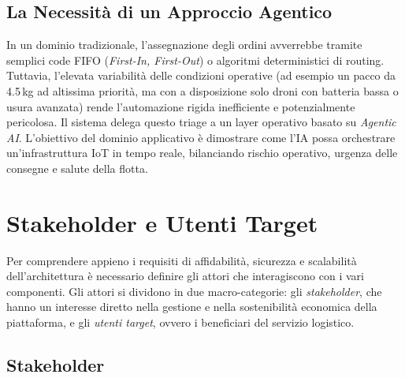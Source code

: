 \subsection*{La Necessità di un Approccio Agentico}

In un dominio tradizionale, l'assegnazione degli ordini avverrebbe tramite semplici code FIFO (\textit{First-In, First-Out}) o algoritmi deterministici di routing. Tuttavia, l'elevata variabilità delle condizioni operative (ad esempio un pacco da 4.5\,kg ad altissima priorità, ma con a disposizione solo droni con batteria bassa o usura avanzata) rende l'automazione rigida inefficiente e potenzialmente pericolosa. Il sistema delega questo triage a un layer operativo basato su \textit{Agentic AI}. L'obiettivo del dominio applicativo è dimostrare come l'IA possa orchestrare un'infrastruttura IoT in tempo reale, bilanciando rischio operativo, urgenza delle consegne e salute della flotta.

\section{Stakeholder e Utenti Target}
\label{sec:stakeholder_utenti}

Per comprendere appieno i requisiti di affidabilità, sicurezza e scalabilità dell'architettura è necessario definire gli attori che interagiscono con i vari componenti. Gli attori si dividono in due macro-categorie: gli \textit{stakeholder}, che hanno un interesse diretto nella gestione e nella sostenibilità economica della piattaforma, e gli \textit{utenti target}, ovvero i beneficiari del servizio logistico.

\subsection*{Stakeholder}

